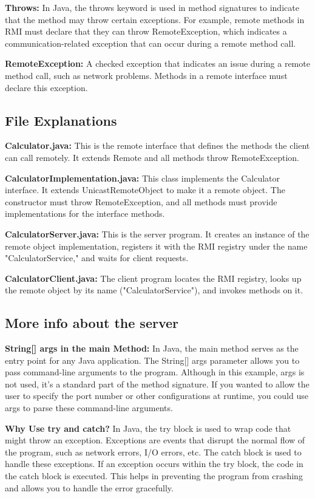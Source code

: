 \documentclass[12pt, letterpaper]{article}
\begin{document}
\textbf{Throws:} In Java, the throws keyword is used in method signatures to 
indicate that the method may throw certain exceptions. For example, remote methods 
in RMI must declare that they can throw RemoteException, which indicates a 
communication-related exception that can occur during a remote method call.

\textbf{RemoteException:} A checked exception that indicates an issue during a 
remote method call, such as network problems. Methods in a remote interface must declare this exception.

\subsection*{File Explanations}
\textbf{Calculator.java:} This is the remote interface that defines the methods the client 
can call remotely. It extends Remote and all methods throw RemoteException.

\textbf{CalculatorImplementation.java:} This class implements the Calculator interface. 
It extends UnicastRemoteObject to make it a remote object. The constructor must
throw RemoteException, and all methods must provide implementations for the interface methods.

\textbf{CalculatorServer.java:} This is the server program. It creates an instance of the 
remote object implementation, registers it with the RMI registry under the name 
"CalculatorService," and waits for client requests.

\textbf{CalculatorClient.java:} The client program locates the RMI registry, 
looks up the remote object by its name ("CalculatorService"), and invokes methods on it.

\subsection*{More info about the server}
\textbf{String[] args in the main Method:} In Java, the main method serves as the 
entry point for any Java application. The String[] args parameter allows you to
 pass command-line arguments to the program. Although in this example, args is not 
 used, it's a standard part of the method signature. If you wanted to allow the 
 user to specify the port number or other configurations at runtime, 
 you could use args to parse these command-line arguments.

\textbf{Why Use try and catch?} In Java, the try block is used to wrap code that 
might throw an exception. Exceptions are events that disrupt the normal flow of the 
program, such as network errors, I/O errors, etc. The catch block is used to handle 
these exceptions. If an exception occurs within the try block, the code in the 
catch block is executed. This helps in preventing the program from crashing and 
allows you to handle the error gracefully.
\end{document}
